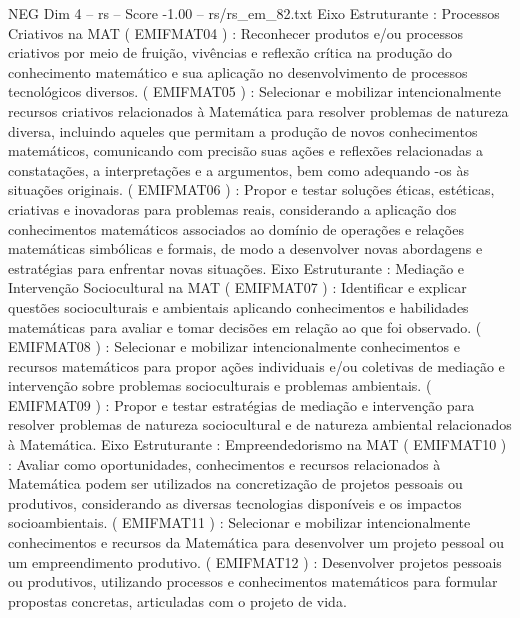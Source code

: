 \begin{textsample}{NEG Dim 4 – rs – Score -1.00 – rs/rs\_em\_82.txt}
Eixo Estruturante : Processos Criativos na MAT ( EMIFMAT04 ) : Reconhecer produtos e/ou processos criativos por meio de fruição, vivências e reflexão crítica na produção do conhecimento matemático e sua aplicação no desenvolvimento de processos tecnológicos diversos. ( EMIFMAT05 ) : Selecionar e mobilizar intencionalmente recursos criativos relacionados à Matemática para resolver problemas de natureza diversa, incluindo aqueles que permitam a produção de novos conhecimentos matemáticos, comunicando com precisão suas ações e reflexões relacionadas a constatações, a interpretações e a argumentos, bem como adequando -os às situações originais. ( EMIFMAT06 ) : Propor e testar soluções éticas, estéticas, criativas e inovadoras para problemas reais, considerando a aplicação dos conhecimentos matemáticos associados ao domínio de operações e relações matemáticas simbólicas e formais, de modo a desenvolver novas abordagens e estratégias para enfrentar novas situações.
Eixo Estruturante : Mediação e Intervenção Sociocultural na MAT ( EMIFMAT07 ) : Identificar e explicar questões socioculturais e ambientais aplicando conhecimentos e habilidades matemáticas para avaliar e tomar decisões em relação ao que foi observado. ( EMIFMAT08 ) : Selecionar e mobilizar intencionalmente conhecimentos e recursos matemáticos para propor ações individuais e/ou coletivas de mediação e intervenção sobre problemas socioculturais e problemas ambientais. ( EMIFMAT09 ) : Propor e testar estratégias de mediação e intervenção para resolver problemas de natureza sociocultural e de natureza ambiental relacionados à Matemática.
Eixo Estruturante : Empreendedorismo na MAT ( EMIFMAT10 ) : Avaliar como oportunidades, conhecimentos e recursos relacionados à Matemática podem ser utilizados na concretização de projetos pessoais ou produtivos, considerando as diversas tecnologias disponíveis e os impactos socioambientais. ( EMIFMAT11 ) : Selecionar e mobilizar intencionalmente conhecimentos e recursos da Matemática para desenvolver um projeto pessoal ou um empreendimento produtivo. ( EMIFMAT12 ) : Desenvolver projetos pessoais ou produtivos, utilizando processos e conhecimentos matemáticos para formular propostas concretas, articuladas com o projeto de vida.

\end{textsample}
